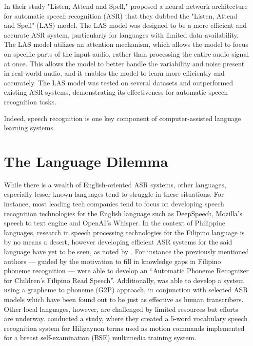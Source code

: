 In their study "Listen, Attend and Spell," \citeauthor{chan-2015} \citeyear{chan-2015} proposed a neural network architecture for automatic speech recognition (ASR) that they dubbed the "Listen, Attend and Spell" (LAS) model. The LAS model was designed to be a more efficient and accurate ASR system, particularly for languages with limited data availability. The LAS model utilizes an attention mechanism, which allows the model to focus on specific parts of the input audio, rather than processing the entire audio signal at once. This allows the model to better handle the variability and noise present in real-world audio, and it enables the model to learn more efficiently and accurately. The LAS model was tested on several datasets and outperformed existing ASR systems, demonstrating its effectiveness for automatic speech recognition tasks.

Indeed, speech recognition is one key component of computer-assisted language learning systems.


\section{The Language Dilemma}
While there is a wealth of English-oriented ASR systems, other languages, especially lesser known languages tend to struggle in these situations. For instance, most leading tech companies tend to focus on developing speech recognition technologies for the English language such as DeepSpeech, Mozilla’s speech to text engine and OpenAI’s Whisper. In the context of Philippine languages, research in speech processing technologies for the Filipino language is by no means a desert, however developing efficient ASR systems for the said language have yet to be seen, as noted by \citeauthor{dimzon-2020} \citeyear{dimzon-2020} . For instance the previously mentioned authors — guided by the motivation to fill in knowledge gaps in Filipino phoneme recognition — were able to develop an “Automatic Phoneme Recognizer for Children’s Filipino Read Speech”. Additionally, \citeauthor{aquino-2019} \citeyear{aquino-2019} was able to develop a system using a grapheme to phoneme (G2P) approach, in conjunction with selected ASR models which have been found out to be just as effective as human transcribers. Other local languages, however, are challenged by limited resources but efforts are underway. \citeauthor{billones-2014} \citeyear{billones-2014} conducted a study, where they created a 5-word vocabulary speech recognition system for Hiligaynon terms used as motion commands implemented for a breast self-examination (BSE) multimedia training system.

